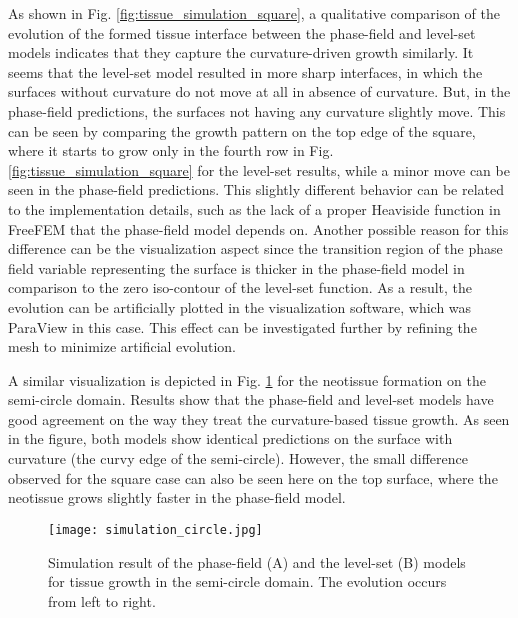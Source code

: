 As shown in Fig. \ref{fig:tissue_simulation_square}, a qualitative comparison of the evolution of the formed tissue interface between the phase-field and level-set models indicates that they capture the curvature-driven growth similarly. It seems that the level-set model resulted in more sharp interfaces, in which the surfaces without curvature do not move at all in absence of curvature. But, in the phase-field predictions, the surfaces not having any curvature slightly move. This can be seen by comparing the growth pattern on the top edge of the square, where it starts to grow only in the fourth row in Fig. \ref{fig:tissue_simulation_square} for the level-set results, while a minor move can be seen in the phase-field predictions. This slightly different behavior can be related to the implementation details, such as the lack of a proper Heaviside function in FreeFEM that the phase-field model depends on. Another possible reason for this difference can be the visualization aspect since the transition region of the phase field variable representing the surface is thicker in the phase-field model in comparison to the zero iso-contour of the level-set function. As a result, the evolution can be artificially plotted in the visualization software, which was ParaView in this case. This effect can be investigated further by refining the mesh to minimize artificial evolution. 

A similar visualization is depicted in Fig. \ref{fig:tissue_simulation_circle} for the neotissue formation on the semi-circle domain. Results show that the phase-field and level-set models have good agreement on the way they treat the curvature-based tissue growth. As seen in the figure, both models show identical predictions on the surface with curvature (the curvy edge of the semi-circle). However, the small difference observed for the square case can also be seen here on the top surface, where the neotissue grows slightly faster in the phase-field model.

\begin{figure}
\medskip
\centering
\texttt{[image: simulation\_circle.jpg]}
\caption[Simulation result of tissue growth in the semi-circle domain]{Simulation result of the phase-field (A) and the level-set (B) models for tissue growth in the semi-circle domain. The evolution occurs from left to right.}
\label{fig:tissue_simulation_circle}
\end{figure}

